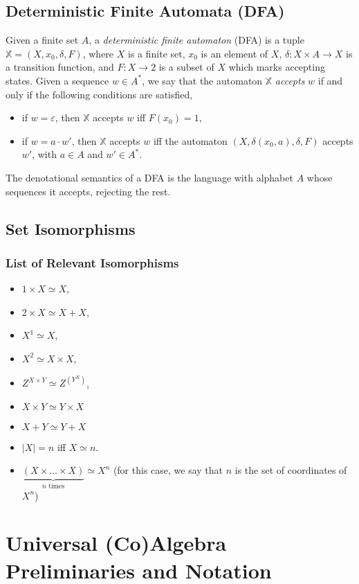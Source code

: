 \subsection{Deterministic Finite Automata (DFA)}
Given a finite set $A$, a \emph{deterministic finite automaton} (DFA) is a tuple $\mathbb{X}=(X,x_0,\delta,F)$, where $X$ is a finite set, $x_0$ is an element of $X$, $\delta\colon X\times A \rightarrow X$ is a transition function, and $F\colon X\rightarrow 2$ is a subset of $X$ which marks accepting states. Given a sequence $w\in A^*$, we say that the automaton $\mathbb{X}$ \emph{accepts} $w$ if and only if the following conditions are satisfied,
\begin{itemize}
    \item if $w=\varepsilon$, then $\mathbb{X}$ accepts $w$ iff $F(x_0)=1$, 
    \item if $w=a\cdot w'$, then $\mathbb{X}$ accepts $w$ iff the automaton $(X,\delta(x_0,a),\delta,F)$ accepts $w'$, with $a\in A$ and $w'\in A^*$.
\end{itemize}
The denotational semantics of a DFA is the language with alphabet $A$ whose sequences it accepts, rejecting the rest.

\subsection{Set Isomorphisms}
\subsubsection{List of Relevant Isomorphisms}
\begin{itemize}
    \item $1\times X \simeq X$,
    \item $2\times X\simeq X+X$,
    \item $X^1\simeq X$,
    \item $X^2\simeq X\times X$,
    \item $Z^{X\times Y}\simeq Z^{(Y^X)}$,
    \item $X\times Y \simeq Y\times X$
    \item $X + Y \simeq Y+ X$
    \item $|X|=n$ iff $X\simeq n$.
    \item $\underbrace{\left(X\times\ldots\times X\right)}_\text{$n$ times}\simeq X^n$ (for this case, we say that $n$ is the set of coordinates of $X^n$)
\end{itemize}
\section{Universal (Co)Algebra Preliminaries and Notation}
\label{sec:Preliminaries:Coalgebras}
